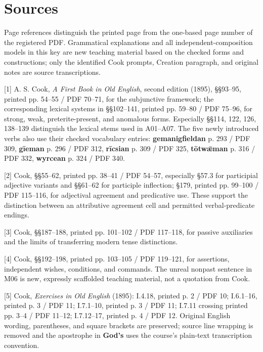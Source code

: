 \clearpage
\section*{Sources}

\begingroup\fontsize{10}{12.8}\selectfont
Page references distinguish the printed page from the one-based page number of the registered PDF. Grammatical explanations and all independent-composition models in this key are new teaching material based on the checked forms and constructions; only the identified Cook prompts, Creation paragraph, and original notes are source transcriptions.

[1] A. S. Cook, \emph{A First Book in Old English}, second edition (1895), §§93–95, printed pp. 54–55 /\allowbreak{} PDF 70–71, for the subjunctive framework; the corresponding lexical systems in §§102–141, printed pp. 59–80 /\allowbreak{} PDF 75–96, for strong, weak, preterite-present, and anomalous forms. Especially §§114, 122, 126, 138–139 distinguish the lexical stems used in A01–A07. The five newly introduced verbs also use their checked vocabulary entries: \textbf{gemanigfieldan} p. 293 /\allowbreak{} PDF 309, \textbf{gīeman} p. 296 /\allowbreak{} PDF 312, \textbf{rīcsian} p. 309 /\allowbreak{} PDF 325, \textbf{tōtwǣman} p. 316 /\allowbreak{} PDF 332, \textbf{wyrcean} p. 324 /\allowbreak{} PDF 340.

[2] Cook, §§55–62, printed pp. 38–41 /\allowbreak{} PDF 54–57, especially §57.3 for participial adjective variants and §§61–62 for participle inflection; §179, printed pp. 99–100 /\allowbreak{} PDF 115–116, for adjectival agreement and predicative use. These support the distinction between an attributive agreement cell and permitted verbal-predicate endings.

[3] Cook, §§187–188, printed pp. 101–102 /\allowbreak{} PDF 117–118, for passive auxiliaries and the limits of transferring modern tense distinctions.

[4] Cook, §§192–198, printed pp. 103–105 /\allowbreak{} PDF 119–121, for assertions, independent wishes, conditions, and commands. The unreal nonpast sentence in M06 is new, expressly scaffolded teaching material, not a quotation from Cook.

[5] Cook, \emph{Exercises in Old English} (1895): I.4.18, printed p. 2 /\allowbreak{} PDF 10; I.6.1–16, printed p. 3 /\allowbreak{} PDF 11; I.7.1–10, printed p. 3 /\allowbreak{} PDF 11; I.7.11 crossing printed pp. 3–4 /\allowbreak{} PDF 11–12; I.7.12–17, printed p. 4 /\allowbreak{} PDF 12. Original English wording, parentheses, and square brackets are preserved; source line wrapping is removed and the apostrophe in \textbf{God's} uses the course’s plain-text transcription convention.

